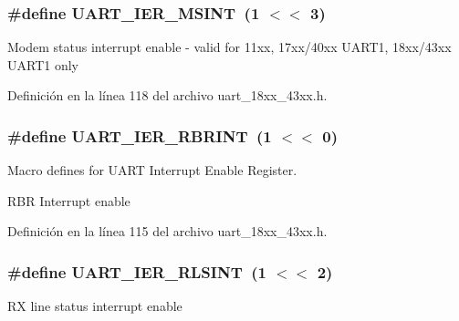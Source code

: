 \subsubsection[{\texorpdfstring{U\+A\+R\+T\+\_\+\+I\+E\+R\+\_\+\+M\+S\+I\+NT}{UART_IER_MSINT}}]{\setlength{\rightskip}{0pt plus 5cm}\#define U\+A\+R\+T\+\_\+\+I\+E\+R\+\_\+\+M\+S\+I\+NT~(1 $<$$<$ 3)}\hypertarget{group___u_a_r_t__18_x_x__43_x_x_ga149affc2ce17a660a640f26d3212a624}{}\label{group___u_a_r_t__18_x_x__43_x_x_ga149affc2ce17a660a640f26d3212a624}
Modem status interrupt enable -\/ valid for 11xx, 17xx/40xx U\+A\+R\+T1, 18xx/43xx U\+A\+R\+T1 only 

Definición en la línea 118 del archivo uart\+\_\+18xx\+\_\+43xx.\+h.

\subsubsection[{\texorpdfstring{U\+A\+R\+T\+\_\+\+I\+E\+R\+\_\+\+R\+B\+R\+I\+NT}{UART_IER_RBRINT}}]{\setlength{\rightskip}{0pt plus 5cm}\#define U\+A\+R\+T\+\_\+\+I\+E\+R\+\_\+\+R\+B\+R\+I\+NT~(1 $<$$<$ 0)}\hypertarget{group___u_a_r_t__18_x_x__43_x_x_gafe8ecd345fb121d6b0ce19f4ce6672ba}{}\label{group___u_a_r_t__18_x_x__43_x_x_gafe8ecd345fb121d6b0ce19f4ce6672ba}


Macro defines for U\+A\+RT Interrupt Enable Register. 

R\+BR Interrupt enable 

Definición en la línea 115 del archivo uart\+\_\+18xx\+\_\+43xx.\+h.

\subsubsection[{\texorpdfstring{U\+A\+R\+T\+\_\+\+I\+E\+R\+\_\+\+R\+L\+S\+I\+NT}{UART_IER_RLSINT}}]{\setlength{\rightskip}{0pt plus 5cm}\#define U\+A\+R\+T\+\_\+\+I\+E\+R\+\_\+\+R\+L\+S\+I\+NT~(1 $<$$<$ 2)}\hypertarget{group___u_a_r_t__18_x_x__43_x_x_ga79f6b167debe3a8e37d40e4d30f1daec}{}\label{group___u_a_r_t__18_x_x__43_x_x_ga79f6b167debe3a8e37d40e4d30f1daec}
RX line status interrupt enable 

